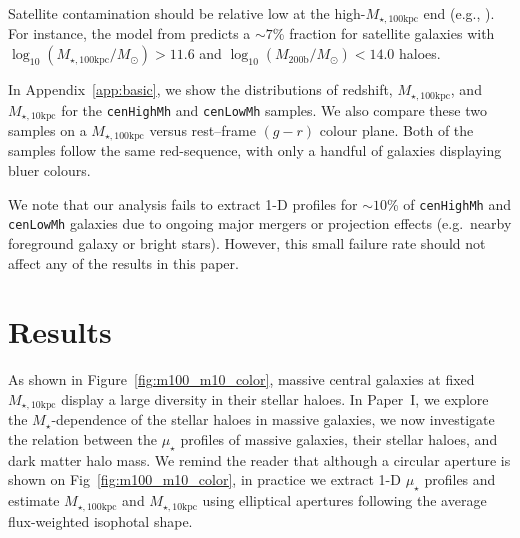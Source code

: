 \documentclass[a4paper,fleqn,usenatbib]{mnras}
\def\rbcg{\texttt{cenHighMh}}
\def\nbcg{\texttt{cenLowMh}}
\def\mstar{{$M_{\star}$}}
\def\logmh{{$\log_{10} (M_{\mathrm{200b}}/M_{\odot})$}}
\def\minn{{$M_{\star,10\mathrm{kpc}}$}}
\def\mtot{{$M_{\star,100\mathrm{kpc}}$}}
\def\logmtot{{$\log_{10} (M_{\star,100\mathrm{kpc}}/M_{\odot})$}}
\def\mden{{$\mu_{\star}$}}
\begin{document}
    Satellite contamination should be relative low at the high-\mtot{} end
    (e.g., \citealt{Reid2014, Hoshino2015, Saito2016, vanUitert2016}). 
    For instance, the model from \citet{Saito2016} predicts a $\sim 7$\% 
    fraction for satellite galaxies with \logmtot{}$>11.6$ and \logmh$<14.0$ haloes.
    
    In Appendix~\ref{app:basic}, we show the distributions of redshift, \mtot{}, and 
    \minn{} for the \rbcg{} and \nbcg{} samples. 
    We also compare these two samples on a \mtot{} versus rest--frame $(g-r)$ colour 
    plane. 
    Both of the samples follow the same red-sequence, with only a handful of galaxies 
    displaying bluer colours.
    
    We note that our analysis fails to extract 1-D profiles for $\sim10$\% of 
    \rbcg{} and \nbcg{} galaxies due to ongoing major mergers or projection effects 
    (e.g.\ nearby foreground galaxy or bright stars). 
    However, this small failure rate should not affect any of the results in this paper.
    

\section{Results}
    \label{sec:result}
    
    As shown in Figure~\ref{fig:m100_m10_color}, massive central galaxies at fixed  
    \minn{} display a large diversity in their stellar haloes. 
    In Paper~I, we explore the \mstar{}-dependence of the stellar haloes in massive 
    galaxies, we now investigate the relation between the \mden{} profiles of 
    massive galaxies, their stellar haloes, and dark matter halo mass. 
    We remind the reader that although a circular aperture is shown on 
    Fig~\ref{fig:m100_m10_color}, in practice we extract 1-D \mden{} profiles and 
    estimate \mtot{} and \minn{} using elliptical apertures following the average 
    flux-weighted isophotal shape. 

\end{document}
